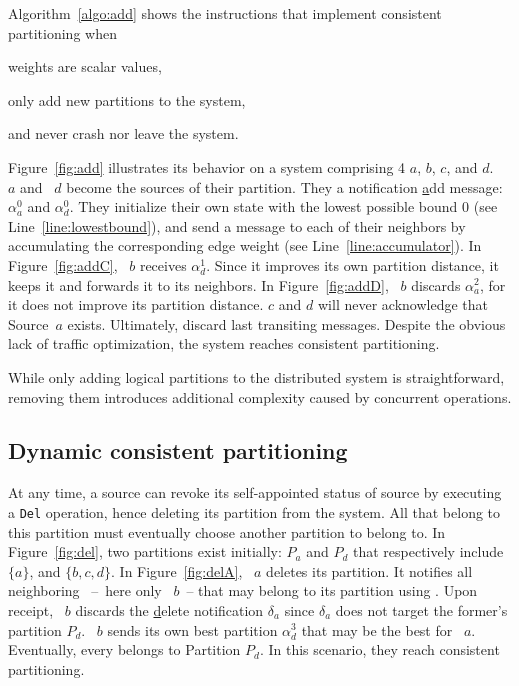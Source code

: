 Algorithm~\ref{algo:add} shows the instructions that implement
consistent partitioning when
\begin{inparaenum}[(i)]
\item weights are scalar values,
\item \processes only add new partitions to the system,
\item and \processes never crash nor leave the system.
\end{inparaenum}
Figure~\ref{fig:add} illustrates its behavior on a system comprising 4
\processes $a$, $b$, $c$, and $d$. \Process~$a$ and \Process~$d$
become the sources of their partition. They \NAMEB a notification
\underline{a}dd message: $\alpha_a^0$ and $\alpha_d^0$. They
initialize their own state with the lowest possible bound $0$ (see
Line~\ref{line:lowestbound}), and send a message to each of their
neighbors by accumulating the corresponding edge weight (see
Line~\ref{line:accumulator}). In Figure~\ref{fig:addC}, \Process~$b$
receives $\alpha_{d}^{1}$. Since it improves its own partition
distance, it keeps it and forwards it to its neighbors. In
Figure~\ref{fig:addD}, \Process~$b$ discards $\alpha_{a}^{2}$, for it
does not improve its partition distance. \Processes $c$ and $d$ will
never acknowledge that Source~$a$ exists. Ultimately, \processes
discard last transiting messages. Despite the obvious lack of traffic
optimization, the system reaches consistent partitioning.

While only adding logical partitions to the distributed system is
straightforward, removing them introduces additional complexity caused
by concurrent operations.

\subsection{Dynamic consistent partitioning}
\label{subsec:dynamic}




At any time, a source can revoke its self-appointed status of source
by executing a \texttt{Del} operation, hence deleting its partition
from the system. All \processes that belong to this partition must
eventually choose another partition to belong to. In
Figure~\ref{fig:del}, two partitions exist initially: $P_a$ and $P_d$
that respectively include $\{a\}$, and $\{b, c, d\}$. In
Figure~\ref{fig:delA}, \Process~$a$ deletes its partition. It notifies
all neighboring \processes~--~here only \Process~$b$~-- that may
belong to its partition using \NAMEB. Upon receipt, \Process~$b$
discards the \underline{d}elete notification $\delta_a$ since
$\delta_a$ does not target the former's partition $P_d$. \Process~$b$
sends its own best partition $\alpha_d^3$ that may be the best for
\Process~$a$. Eventually, every \process belongs to Partition
$P_d$. In this scenario, they reach consistent partitioning.

